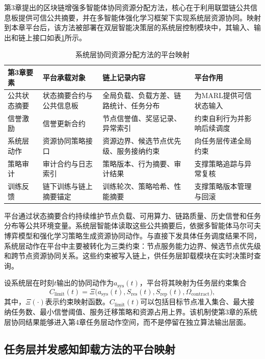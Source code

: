 第3章提出的区块链增强多智能体协同资源分配方法，核心在于利用联盟链公共信息板提供可信公共摘要，并在多智能体强化学习框架下实现系统层资源协同。映射到本章平台后，该方法被部署在双层智能决策层的系统层控制模块中，其输入、输出和链上接口如表\ref{tab:ch3_mapping}所示。

\begin{table}[htbp]
  \centering
  \caption{系统层协同资源分配方法的平台映射}
  \label{tab:ch3_mapping}
  \begin{tabular}{p{2.8cm}p{4.2cm}p{4.0cm}p{3.0cm}}
    \toprule
    第3章要素 & 平台承载对象 & 链上记录内容 & 平台作用 \\
    \midrule
    公共状态摘要 & 状态摘要合约与公共信息板 & 全局负载、负载方差、链路统计、任务分布 & 为MARL提供可信状态输入 \\
    信誉激励 & 信誉更新合约 & 节点信誉值、奖惩记录、异常索引 & 约束自利行为并影响后续调度 \\
    系统层动作 & 资源协同策略接口 & 资源边界、候选节点优先级、服务接纳约束 & 向任务层传递全局约束 \\
    策略审计 & 审计合约与日志索引 & 策略版本、行为摘要、审计结果 & 支撑策略追踪与异常复核 \\
    训练反馈 & 链下训练与链上摘要锚定 & 训练轮次、策略哈希、性能摘要 & 支撑策略版本管理与回滚 \\
    \bottomrule
  \end{tabular}
\end{table}

平台通过状态摘要合约持续维护节点负载、可用算力、链路质量、历史信誉和任务分布等公共环境变量。系统层智能体读取这些公共摘要后，依据多智能体马尔可夫博弈模型和强化学习策略生成资源协同动作。与直接下发具体任务调度结果不同，系统层动作在平台中主要被转化为三类约束：节点服务能力边界、候选节点优先级和跨节点资源协同关系。这些约束被写入链上，供任务层卸载模块在实时决策时查询。

设系统层在时刻\(t\)输出的协同动作为\(a_{\mathrm{sys}}(t)\)，平台将其映射为任务层约束集合
\begin{equation}
  C_{\mathrm{limit}}(t)=\Xi\big(a_{\mathrm{sys}}(t),S_{\mathrm{res}}(t),S_{\mathrm{rep}}(t),\Omega_{\mathrm{contract}}\big),
  \label{eq:sys_to_task_constraint}
\end{equation}
其中，\(\Xi(\cdot)\)表示约束映射函数。\(C_{\mathrm{limit}}(t)\)可以包括目标节点准入集合、最大接纳任务数、最小信誉阈值、服务迁移策略和资源占用上界。该机制使第3章的系统层协同结果能够进入第4章任务层动作空间，而不是停留在独立算法输出层面。

\subsection{任务层并发感知卸载方法的平台映射}

